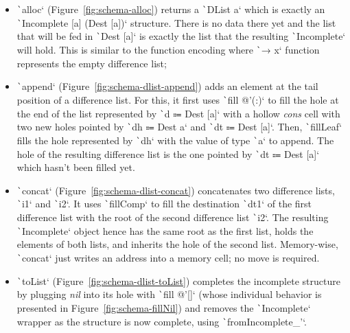 \documentclass[english]{jflart}
\begin{document}
\begin{itemize}
  \item \texttt`alloc` (Figure~\ref{fig:schema-alloc}) returns a
    \texttt`DList a` which is exactly an
    \texttt`Incomplete [a] (Dest [a])` structure. There is no data
    there yet and the list that will be fed in \texttt`Dest [a]` is exactly the list that the
    resulting \texttt`Incomplete` will hold. This is
    similar to the function encoding where \texttt`\x → x` function represents the empty difference list;
    

  \item \texttt`append` (Figure~\ref{fig:schema-dlist-append}) adds an element at the tail
    position of a difference list. For this, it first uses
    \texttt`fill @'(:)` to fill the hole at the end of the list represented by
    \texttt`d ⩴ Dest [a]` with a hollow \emph{cons}
    cell with two new holes pointed by \texttt`dh ⩴ Dest a` and \texttt`dt ⩴ Dest [a]`. Then,
    \texttt`fillLeaf` fills the hole represented by
    \texttt`dh` with the value
    of type \texttt`a`
    to append. The hole of the resulting difference list is the one pointed by \texttt`dt ⩴ Dest [a]` which hasn't been filled yet.

  \item \texttt`concat` (Figure~\ref{fig:schema-dlist-concat}) concatenates two difference lists,
    \texttt`i1` and \texttt`i2`. It uses \texttt`fillComp` to fill the destination \texttt`dt1`
    of the first difference list with the
    root of the second difference list \texttt`i2`. The resulting \texttt`Incomplete`
    object hence has the same root as the first list, holds the
    elements of both lists, and inherits the hole of the second list. Memory-wise,
    \texttt`concat` just writes an address into a memory cell; no move is
    required.

  \item \texttt`toList` (Figure~\ref{fig:schema-dlist-toList}) completes the incomplete structure by plugging \emph{nil} into its hole with \texttt`fill @'[]` (whose individual behavior is presented in Figure~\ref{fig:schema-fillNil}) and removes the \texttt`Incomplete` wrapper as the structure is now complete, using \texttt`fromIncomplete_'`.
\end{itemize}
\end{document}
